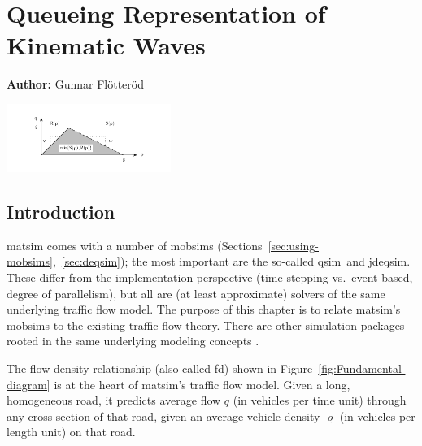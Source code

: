 \chapter{Queueing Representation of Kinematic Waves}
\label{ch:kinematicwaves}

\hfill \textbf{Author:} Gunnar Flötteröd

\begin{center} \includegraphics[width=0.4\textwidth, angle=0]{understanding/figures/waves/fig0.pdf} \end{center}


\newcommand{\SINGLEQUEUESIM}{\gls{qsim}}
\newcommand{\DOUBLEQUEUESIM}{\gls{jdeqsim}}

\section{\label{sec:Introduction}Introduction}

\gls{matsim} comes with a number of \glspl{mobsim} 
(\cf Sections~\ref{sec:using-mobsims},~\ref{sec:deqsim}); the most
important are the so-called \SINGLEQUEUESIM\ and 
\DOUBLEQUEUESIM. These differ from the implementation perspective
(time-stepping vs.\ event-based, degree of parallelism), but 
all are (at least approximate) solvers of the same underlying traffic flow model.
The purpose of this chapter is to relate \gls{matsim}'s \glspl{mobsim} 
to the existing traffic flow theory. 
There are other  simulation packages rooted in the same underlying
modeling concepts \citep[][]{mahut-2007,zhou-2014}. 

The flow-density relationship (also called \gls{fd})\corr{,}{} shown in
Figure~\ref{fig:Fundamental-diagram} is at the heart of \gls{matsim}'s traffic flow model.
Given a long, homogeneous
road, it predicts average flow $q$ (in vehicles per time unit)
through any cross-section of that road, given an average vehicle density
$\varrho$ (in vehicles per length unit) on that road. 

